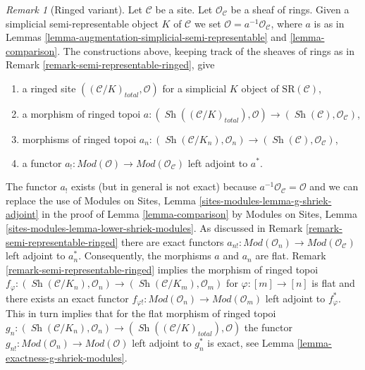 \documentclass{stacks-project}
\theoremstyle{plain}
\theoremstyle{definition}
\theoremstyle{remark}
\newtheorem{remark}[subsection]{Remark}
\numberwithin{equation}{subsection}
\def\Sh{\mathop{\mathit{Sh}}\nolimits}
\begin{document}
\begin{remark}[Ringed variant]
\label{remark-augmentation-ringed}
Let $\mathcal{C}$ be a site. Let $\mathcal{O}_\mathcal{C}$ be a sheaf of rings.
Given a simplicial semi-representable object $K$ of $\mathcal{C}$
we set $\mathcal{O} = a^{-1}\mathcal{O}_\mathcal{C}$, where $a$
is as in Lemmas \ref{lemma-augmentation-simplicial-semi-representable} and
\ref{lemma-comparison}.
The constructions above, keeping track of the sheaves of rings
as in Remark \ref{remark-semi-representable-ringed}, give
\begin{enumerate}
\item a ringed site $((\mathcal{C}/K)_{total}, \mathcal{O})$
for a simplicial $K$ object of $\text{SR}(\mathcal{C})$,
\item a morphism of ringed topoi
$a : (\Sh((\mathcal{C}/K)_{total}), \mathcal{O}) \to
(\Sh(\mathcal{C}), \mathcal{O}_\mathcal{C})$,
\item morphisms of ringed topoi
$a_n : (\Sh(\mathcal{C}/K_n), \mathcal{O}_n) \to
(\Sh(\mathcal{C}), \mathcal{O}_\mathcal{C})$,
\item a functor
$a_! : \textit{Mod}(\mathcal{O}) \to \textit{Mod}(\mathcal{O}_\mathcal{C})$
left adjoint to $a^*$.
\end{enumerate}
The functor $a_!$ exists (but in general is not exact)
because $a^{-1}\mathcal{O}_\mathcal{C} = \mathcal{O}$
and we can replace the use of
Modules on Sites, Lemma \ref{sites-modules-lemma-g-shriek-adjoint}
in the proof of Lemma \ref{lemma-comparison}
by Modules on Sites, Lemma \ref{sites-modules-lemma-lower-shriek-modules}.
As discussed in Remark \ref{remark-semi-representable-ringed}
there are exact functors
$a_{n!} : \textit{Mod}(\mathcal{O}_n) \to
\textit{Mod}(\mathcal{O}_\mathcal{C})$
left adjoint to $a_n^*$. Consequently, the morphisms $a$ and $a_n$ are flat.
Remark \ref{remark-semi-representable-ringed}
implies the morphism of ringed topoi
$f_\varphi : (\Sh(\mathcal{C}/K_n), \mathcal{O}_n) \to
(\Sh(\mathcal{C}/K_m), \mathcal{O}_m)$
for $\varphi : [m] \to [n]$ is flat and there exists an exact functor
$f_{\varphi !} : \textit{Mod}(\mathcal{O}_n) \to \textit{Mod}(\mathcal{O}_m)$
left adjoint to $f_\varphi^*$. This in turn implies that for
the flat morphism of ringed topoi
$g_n : (\Sh(\mathcal{C}/K_n), \mathcal{O}_n) \to
(\Sh((\mathcal{C}/K)_{total}), \mathcal{O})$
the functor $g_{n!} : \textit{Mod}(\mathcal{O}_n) \to
\textit{Mod}(\mathcal{O})$ left adjoint to $g_n^*$ is exact, see
Lemma \ref{lemma-exactness-g-shriek-modules}.
\end{remark}
\end{document}
